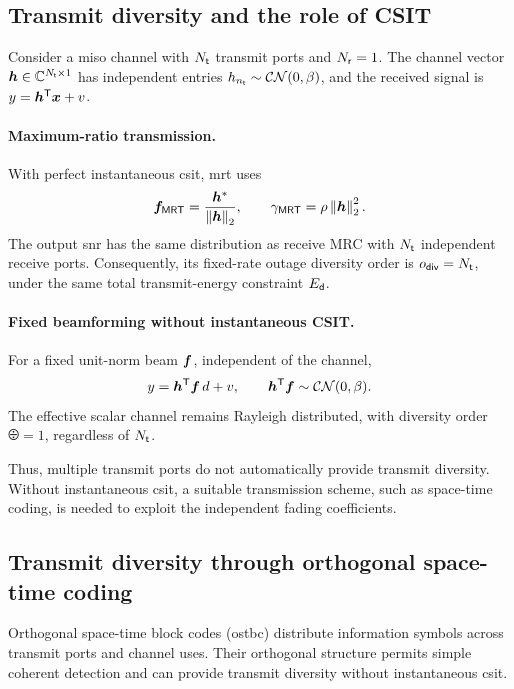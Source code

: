 \subsection{Transmit diversity and the role of CSIT}

Consider a \ac{miso} channel with $N_{\mathsf{t}}$ transmit ports and $N_{\mathsf{r}}=1$. The channel vector $\bm{h}\in\mathbb{C}^{N_{\mathsf{t}}\times1}$ has independent entries $h_{n_{\mathsf{t}}}\sim\mathcal{CN}(0,\beta)$, and the received signal is $y={\bm{h}}^{\mathsf{T}}\bm{x}+v$.

\paragraph{Maximum-ratio transmission.}
With perfect instantaneous \ac{csit}, \ac{mrt} uses
\begin{equation*}
	\bm{f}_{\mathsf{MRT}}
	=\frac{{\bm{h}}^{*}}{\left\|\bm{h}\right\|_2},
	\qquad
	\gamma_{\mathsf{MRT}}=\rho\left\|\bm{h}\right\|_2^2.
\end{equation*}
The output \ac{snr} has the same distribution as receive MRC with $N_{\mathsf{t}}$ independent receive ports. Consequently, its fixed-rate outage diversity order is $o_{\mathsf{div}}=N_{\mathsf{t}}$, under the same total transmit-energy constraint $E_{\mathsf{d}}$.

\paragraph{Fixed beamforming without instantaneous CSIT.}
For a fixed unit-norm beam $\bm{f}$, independent of the channel,
\begin{equation*}
	y={\bm{h}}^{\mathsf{T}}\bm{f}\,d+v,
	\qquad
	{\bm{h}}^{\mathsf{T}}\bm{f}\sim\mathcal{CN}(0,\beta).
\end{equation*}
The effective scalar channel remains Rayleigh distributed, with diversity order $\odiv=1$, regardless of $N_{\mathsf{t}}$.

Thus, multiple transmit ports do not automatically provide transmit diversity. Without instantaneous \ac{csit}, a suitable transmission scheme, such as space-time coding, is needed to exploit the independent fading coefficients.


\subsection{Transmit diversity through orthogonal space-time coding}

Orthogonal space-time block codes (\ac{ostbc}) distribute information symbols across transmit ports and channel uses. Their orthogonal structure permits simple coherent detection and can provide transmit diversity without instantaneous \ac{csit}.


